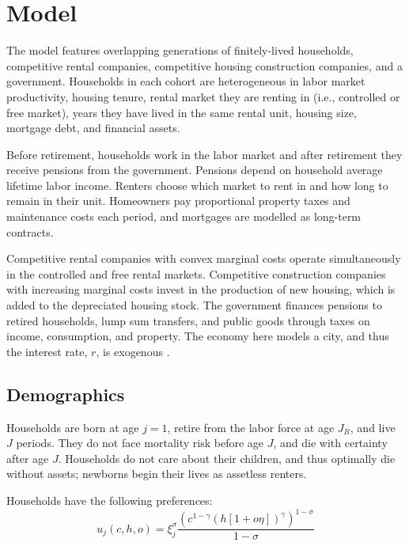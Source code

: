 \documentclass[parskip=full]{article}
\begin{document}
\section{Model}\label{sec:model}

The model features overlapping generations of finitely-lived households, competitive rental companies, competitive housing construction companies, and a government. Households in each cohort are heterogeneous in labor market productivity, housing tenure, rental market they are renting in (i.e., controlled or free market), years they have lived in the same rental unit, housing size, mortgage debt, and financial assets. 

Before retirement, households work in the labor market and after retirement they receive pensions from the government. Pensions depend on household average lifetime labor income. Renters choose which market to rent in and how long to remain in their unit. Homeowners pay proportional property taxes and maintenance costs each period, and mortgages are modelled as long-term contracts. 

Competitive rental companies with convex marginal costs operate simultaneously in the controlled and free rental markets. Competitive construction companies with increasing marginal costs invest in the production of new housing, which is added to the depreciated housing stock. The government finances pensions to retired households, lump sum transfers, and public goods through taxes on income, consumption, and property. The economy here models a city, and thus the interest rate, $r$, is exogenous \citep{sommeretal-2013,arslanetal-2015,sommersullivan-2017,kaplanetal-2019}. 

\subsection{Demographics}\label{subsection:demographics}

Households are born at age $j=1$, retire from the labor force at age $J_{R}$, and live $J$ periods. They do not face mortality risk before age $J$, and die with certainty after age $J$. Households do not care about their children, and thus optimally die without assets; newborns begin their lives as assetless renters.

Households have the following preferences:
\begin{equation*}
    u_{j}(c,h,o)=\xi_{j}^{\sigma}\frac{\left(c^{1-\gamma} \left(h[1+o\eta]\right)^{\gamma}\right)^{1-\sigma}}{1-\sigma}
\end{equation*}
\end{document}
